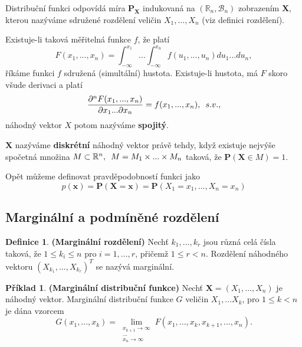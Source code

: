 \documentclass[a4]{report}
\theoremstyle{definition}
\newtheorem{definition}{Definice}[section]
\newtheorem{example}{Příklad}[section]
\begin{document}
{Distribuční funkci odpovídá míra $\textbf{P}_{\textbf{X}}$ indukovaná na $(\mathbb{R}_{n}, \mathcal{B}_{n})$ zobrazením $\textbf{X}$, kterou nazýváme sdružené rozdělení veličin $X_{1}, ..., X_{n}$ (viz definici rozdělení).

Existuje-li taková měřitelná funkce $f$, že platí 
\begin{equation}
F(x_{1}, ..., x_{n}) = \int_{-\infty}^{x_{1}}...\int_{-\infty}^{x_{n}} f(u_{1}, ..., u_{n})du_{1}...du_{n},
\end{equation}
říkáme funkci $f$ sdružená (simultální) hustota. Existuje-li hustota, má $F$ skoro všude derivaci a platí
\begin{equation}
\frac{\partial^{n}F(x_{1}, ..., x_{n})}{\partial x_{1}...\partial x_{n}} = f(x_{1}, ..., x_{n}), \enskip s. v.,
\end{equation}
náhodný vektor $X$ potom nazýváme \textbf{spojitý}.

$\textbf{X}$ nazýváme \textbf{diskrétní} náhodný vektor právě tehdy, když existuje nejvýše spočetná množina $M \subset \mathbb{R}^{n}, \enskip M = M_{1} \times ... \times M_{n}$ taková, že $\textbf{P}(\textbf{X} \in M) = 1$.

Opět můžeme definovat pravděpodobností funkci jako
\begin{equation}
p(\textbf{x}) = \textbf{P}(\textbf{X} = \textbf{x}) = \textbf{P}(X_{1} = x_{1}, ..., X_{n} = x_{n} )
\end{equation}
\subsection{Marginální a podmíněné rozdělení}
\begin{definition}{\textbf{(Marginální rozdělení)}}
Nechť $k_{1}, ..., k_{r}$ jsou různá celá čísla taková, že $1 \leq k_{i} \leq n$ pro $i = 1, ..., r$, přičemž $1 \leq r < n.$ Rozdělení náhodného vektoru $(X_{k_{1}}, ..., X_{k_{r}})^{T}$ se nazývá marginální. 
\end{definition}
\begin{example}{\textbf{(Marginální distribuční funkce)}}
Nechť $\textbf{X} = (X_{1}, ..., X_{n})$ je náhodný vektor. Marginální distribuční funkce $G$ veličin $X_{1}, ... X_{k}$, pro $1 \leq k < n$ je dána vzorcem
\begin{equation}
G(x_{1}, ..., x_{k}) = \lim_{\substack{x_{k+1} \longrightarrow \infty \\ ... \\ x_{n} \longrightarrow \infty}} F(x_{1}, ..., x_{k}, x_{k + 1}, ..., x_{n}).
\end{equation}
\end{example}

}
\end{document}
